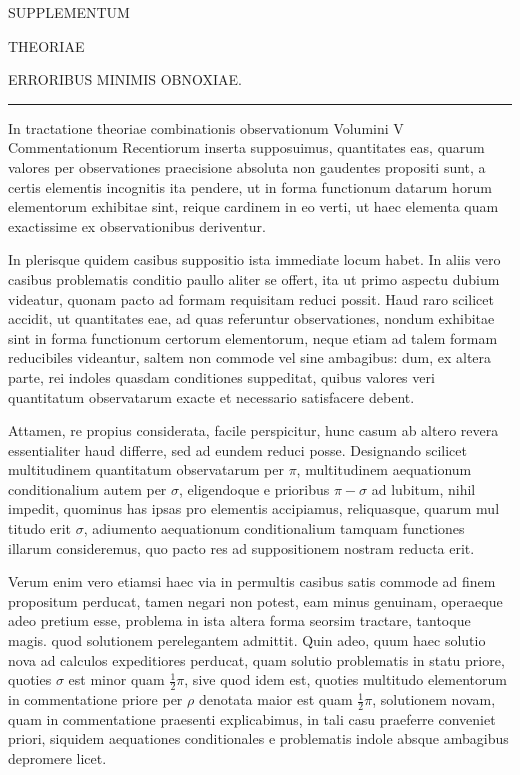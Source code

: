 \begin{center}
{\large SUPPLEMENTUM\par}
\medskip THEORIAE\par
{}
\medskip ERRORIBUS MINIMIS OBNOXIAE.\par
\medskip\rule{.25\linewidth}{.3pt}
\end{center}
In tractatione theoriae combinationis observationum Volumini V Commentationum Recentiorum inserta supposuimus, quantitates eas, quarum valores per observationes praecisione absoluta non gaudentes propositi sunt, a certis elementis incognitis ita pendere, ut in forma functionum datarum horum elementorum exhibitae sint, reique cardinem in eo verti, ut haec elementa quam exactissime ex observationibus deriventur.

In plerisque quidem casibus suppositio ista immediate locum habet. In aliis vero casibus problematis conditio paullo aliter se offert, ita ut primo aspectu dubium videatur, quonam pacto ad formam requisitam reduci possit. Haud raro scilicet accidit, ut quantitates eae, ad quas referuntur observationes, nondum exhibitae sint in forma functionum certorum elementorum, neque etiam ad talem formam reducibiles videantur, saltem non commode vel sine ambagibus: dum, ex altera parte, rei indoles quasdam conditiones suppeditat, quibus valores veri quantitatum observatarum exacte et necessario satisfacere debent.

Attamen, re propius considerata, facile perspicitur, hunc casum ab altero revera essentialiter haud differre, sed ad eundem reduci posse. Designando scilicet multitudinem quantitatum observatarum per \(\pi\), multitudinem aequationum conditionalium autem per \(\sigma\), eligendoque e prioribus \(\pi-\sigma\) ad lubitum, nihil impedit, quominus has ipsas pro elementis accipiamus, reliquasque, quarum mul%
titudo erit \(\sigma\), adiumento aequationum conditionalium tamquam functiones illarum consideremus, quo pacto res ad suppositionem nostram reducta erit.

Verum enim vero etiamsi haec via in permultis casibus satis commode ad finem propositum perducat, tamen negari non potest, eam minus genuinam, operaeque adeo pretium esse, problema in ista altera forma seorsim tractare, tantoque magis. quod solutionem perelegantem admittit. Quin adeo, quum haec solutio nova ad calculos expeditiores perducat, quam solutio problematis in statu priore, quoties \(\sigma\) est minor quam \(\frac12\pi\), sive quod idem est, quoties multitudo elementorum in commentatione priore per \(\rho\) denotata maior est quam \(\frac12\pi\), solutionem novam, quam in commentatione praesenti explicabimus, in tali casu praeferre conveniet priori, siquidem aequationes conditionales e problematis indole absque ambagibus depromere licet.

